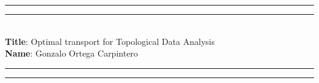 \documentclass[11pt,a4paper]{article}
\begin{document}
\hrule\hrule
\vspace{2mm}
\vspace{1mm} \\
{\bf Title}: Optimal transport for Topological Data Analysis
\vspace{1mm} \\
{\bf Name}: Gonzalo Ortega Carpintero
\vspace{2mm}
\hrule\hrule





\end{document}
